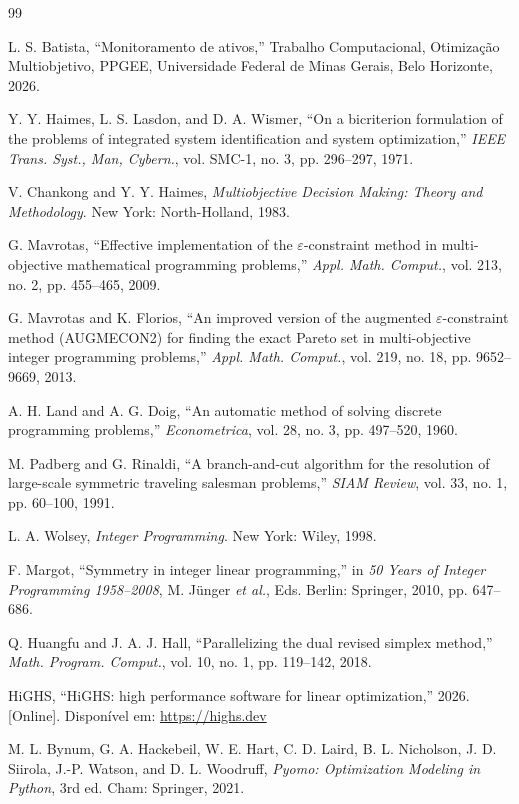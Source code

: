 \documentclass[conference]{IEEEtran}
\begin{document}
\begin{thebibliography}{99}

L. S. Batista, ``Monitoramento de ativos,'' Trabalho Computacional, Otimização Multiobjetivo, PPGEE, Universidade Federal de Minas Gerais, Belo Horizonte, 2026.

Y. Y. Haimes, L. S. Lasdon, and D. A. Wismer, ``On a bicriterion formulation of the problems of integrated system identification and system optimization,'' \emph{IEEE Trans. Syst., Man, Cybern.}, vol. SMC-1, no. 3, pp. 296--297, 1971.

V. Chankong and Y. Y. Haimes, \emph{Multiobjective Decision Making: Theory and Methodology}. New York: North-Holland, 1983.

G. Mavrotas, ``Effective implementation of the $\varepsilon$-constraint method in multi-objective mathematical programming problems,'' \emph{Appl. Math. Comput.}, vol. 213, no. 2, pp. 455--465, 2009.

G. Mavrotas and K. Florios, ``An improved version of the augmented $\varepsilon$-constraint method (AUGMECON2) for finding the exact Pareto set in multi-objective integer programming problems,'' \emph{Appl. Math. Comput.}, vol. 219, no. 18, pp. 9652--9669, 2013.

A. H. Land and A. G. Doig, ``An automatic method of solving discrete programming problems,'' \emph{Econometrica}, vol. 28, no. 3, pp. 497--520, 1960.

M. Padberg and G. Rinaldi, ``A branch-and-cut algorithm for the resolution of large-scale symmetric traveling salesman problems,'' \emph{SIAM Review}, vol. 33, no. 1, pp. 60--100, 1991.

L. A. Wolsey, \emph{Integer Programming}. New York: Wiley, 1998.

F. Margot, ``Symmetry in integer linear programming,'' in \emph{50 Years of Integer Programming 1958--2008}, M. Jünger \emph{et al.}, Eds. Berlin: Springer, 2010, pp. 647--686.

Q. Huangfu and J. A. J. Hall, ``Parallelizing the dual revised simplex method,'' \emph{Math. Program. Comput.}, vol. 10, no. 1, pp. 119--142, 2018.

HiGHS, ``HiGHS: high performance software for linear optimization,'' 2026. [Online]. Disponível em: \url{https://highs.dev}

M. L. Bynum, G. A. Hackebeil, W. E. Hart, C. D. Laird, B. L. Nicholson, J. D. Siirola, J.-P. Watson, and D. L. Woodruff, \emph{Pyomo: Optimization Modeling in Python}, 3rd ed. Cham: Springer, 2021.

\end{thebibliography}
\end{document}
